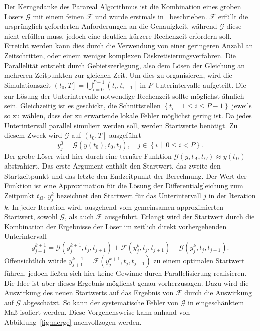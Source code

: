Der Kerngedanke des Parareal Algorithmus ist die Kombination eines groben Lösers \(\mathcal{G}\) mit einem feinen \(\mathcal{F}\) und wurde erstmals in~\cite{Lions:2001} beschrieben. \(\mathcal{F}\) erfüllt die ursprünglich geforderten Anforderungen an die Genauigkeit, während \(\mathcal{G}\) diese nicht erfüllen muss, jedoch eine deutlich kürzere Rechenzeit erfordern soll. Erreicht werden kann dies durch die Verwendung von einer geringeren Anzahl an Zeitschritten, oder einem weniger komplexen Diskretisierungsverfahren. Die Parallelität entsteht durch Gebietszerlegung, also dem Lösen der Gleichung an mehreren Zeitpunkten zur gleichen Zeit. Um dies zu organisieren, wird die Simulationszeit \(\left(t_0, T\right] = \bigcup_{i=0}^{P-1} \left(t_i, t_{i+1}\right]\) in \(P\) Unterintervalle aufgeteilt. Die zur Lösung der Unterintervalle notwendige Rechenzeit sollte möglichst ähnlich sein. Gleichzeitig ist es geschickt, die Schnittstellen \(\left\{t_i \,\middle|\, 1 \leq i \leq P-1\right\}\) jeweils so zu wählen, dass der zu erwartende lokale Fehler möglichst gering ist. Da jedes Unterintervall parallel simuliert werden soll, werden Startwerte benötigt. Zu diesem Zweck wird \(\mathcal{G}\) auf \(\left(t_0, T\right]\) ausgeführt
\begin{displaymath}
    y_{j}^{0} = \mathcal{G}\!\left(y(t_0), t_0, t_{j}\right), \quad j \in \left\{i \,\middle|\, 0 \leq i < P\right\}.
\end{displaymath}
Der grobe Löser wird hier durch eine ternäre Funktion \(\mathcal{G}\!\left(y, t_{A}, t_{\Omega}\right) \approx y(t_\Omega)\) abstrahiert. Das erste Argument enthält den Startwert, das zweite den Startzeitpunkt und das letzte den Endzeitpunkt der Berechnung. Der Wert der Funktion ist eine Approximation für die Lösung der Differentialgleichung zum Zeitpunkt \(t_\Omega\). \(y_j^k\) bezeichnet den Startwert für das Unterintervall \(j\) in der Iteration \(k\). In jeder Iteration wird, ausgehend vom gemeinsamen approximierten Startwert, sowohl \(\mathcal{G}\), als auch \(\mathcal{F}\) ausgeführt. Erlangt wird der Startwert durch die Kombination der Ergebnisse der Löser im zeitlich direkt vorhergehenden Unterintervall
\begin{equation} \label{eq:1}
    y_{j+1}^{k+1} = \mathcal{G}\!\!\left(y_j^{k+1}, t_j, t_{j+1}\right) + \mathcal{F}\!\!\left(y_j^k, t_j, t_{j+1}\right) - \mathcal{G}\!\!\left(y_j^k, t_j, t_{j+1}\right).
\end{equation}
Offensichtlich würde \(y_{j+1}^{k+1} = \mathcal{F}\!\!\left(y_j^{k+1}, t_j, t_{j+1}\right)\) zu einem optimalen Startwert führen, jedoch ließen sich hier keine Gewinne durch Parallelisierung realisieren. Die Idee ist aber dieses Ergebnis möglichst genau vorherzusagen. Dazu wird die Auswirkung des neuen Startwerts auf das Ergebnis von \(\mathcal{F}\) durch die Auswirkung auf \(\mathcal{G}\) abgeschätzt. So kann der systematische Fehler von \(\mathcal{G}\) in eingeschänktem Maß isoliert werden. Diese Vorgehensweise kann anhand von Abbildung~\ref{fig:merge} nachvollzogen werden.
